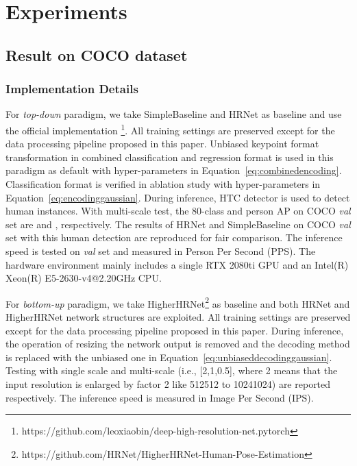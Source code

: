 \documentclass[10pt,journal,compsoc]{IEEEtran}
\begin{document}
\section{Experiments}
\label{sec:EP}


\subsection{Result on COCO dataset}

\subsubsection{Implementation Details}
For \textit{top-down} paradigm, we take SimpleBaseline \cite{SBNet} and HRNet \cite{HRNet} as baseline and use the official implementation \footnote{https://github.com/leoxiaobin/deep-high-resolution-net.pytorch}. All training settings are preserved except for the data processing pipeline proposed in this paper. Unbiased keypoint format transformation in combined classification and regression format is used in this paradigm as default with hyper-parameters  in Equation~\ref{eq:combinedencoding}. Classification format is verified in ablation study with hyper-parameters  in Equation~\ref{eq:encodinggaussian}. During inference, HTC \cite{HTC} detector is used to detect human instances. With multi-scale test, the 80-class and person AP on COCO \textit{val} set \cite{COCO} are  and , respectively. The results of HRNet \cite{HRNet} and SimpleBaseline \cite{SBNet} on COCO \textit{val} set with this human detection are reproduced for fair comparison. The inference speed is tested on \textit{val} set and measured in Person Per Second (PPS). The hardware environment mainly includes a single RTX 2080ti GPU and an Intel(R) Xeon(R) E5-2630-v4@2.20GHz CPU.

For \textit{bottom-up} paradigm, we take HigherHRNet\footnote{https://github.com/HRNet/HigherHRNet-Human-Pose-Estimation} \cite{Higher} as baseline and both HRNet and HigherHRNet network structures are exploited. All training settings are preserved except for the data processing pipeline proposed in this paper. During inference, the operation of resizing the network output is removed and the decoding method is replaced with the unbiased one in Equation~\ref{eq:unbiaseddecodinggaussian}. Testing with single scale and multi-scale (i.e., [2,1,0.5], where 2 means that the input resolution is enlarged by factor 2 like 512512 to 10241024) are reported respectively. The inference speed is measured in Image Per Second (IPS).
\end{document}
